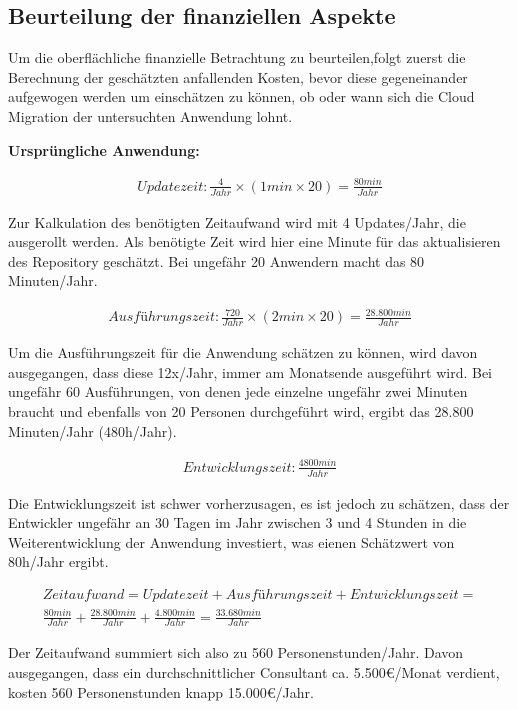 \subsection{Beurteilung der finanziellen Aspekte}
Um die oberflächliche finanzielle Betrachtung zu beurteilen,folgt zuerst die Berechnung der geschätzten anfallenden Kosten, bevor diese gegeneinander aufgewogen werden um einschätzen zu können, ob oder wann sich die Cloud Migration der untersuchten Anwendung lohnt.

\textbf{Ursprüngliche Anwendung:}

\begin{align}
    Updatezeit: \frac{4}{Jahr} \times \left(1min \times 20\right) = \frac{80min}{Jahr}
\end{align}

Zur Kalkulation des benötigten Zeitaufwand wird mit 4 Updates/Jahr, die ausgerollt werden. Als benötigte Zeit wird hier eine Minute für das aktualisieren des \gls{Repository} geschätzt. Bei ungefähr 20 Anwendern macht das 80 Minuten/Jahr.

\begin{align}
    Ausführungszeit: \frac{720}{Jahr} \times \left(2min \times 20\right)  = \frac{28.800min}{Jahr}
\end{align}

Um die Ausführungszeit für die Anwendung schätzen zu können, wird davon ausgegangen, dass diese 12x/Jahr, immer am Monatsende ausgeführt wird. Bei ungefähr 60 Ausführungen, von denen jede einzelne ungefähr zwei Minuten braucht und ebenfalls von 20 Personen durchgeführt wird, ergibt das 28.800 Minuten/Jahr (480h/Jahr).

\begin{align}
    Entwicklungszeit: \frac{4800min}{Jahr}
\end{align}

Die Entwicklungszeit ist schwer vorherzusagen, es ist jedoch zu schätzen, dass der Entwickler ungefähr an 30 Tagen im Jahr zwischen 3 und 4 Stunden in die Weiterentwicklung der Anwendung investiert, was eienen Schätzwert von 80h/Jahr ergibt.

\begin{align}
    Zeitaufwand = Updatezeit + Ausführungszeit + Entwicklungszeit = \\
    \frac{80min}{Jahr} + \frac{28.800min}{Jahr} + \frac{4.800min}{Jahr} = \frac{33.680min}{Jahr}
\end{align}

Der Zeitaufwand summiert sich also zu 560 Personenstunden/Jahr. Davon ausgegangen, dass ein durchschnittlicher Consultant ca. 5.500€/Monat verdient, kosten 560 Personenstunden knapp 15.000€/Jahr. \\

